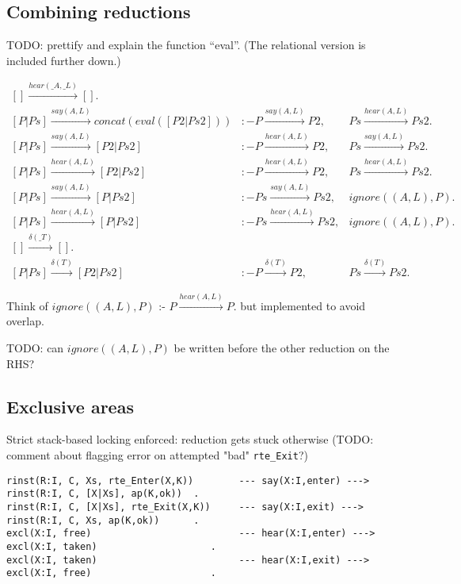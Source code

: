 \subsection{Combining reductions}

TODO: prettify and explain the function ``eval''. (The relational version is included further down.)

\newcommand{\reduce}[3]{\ensuremath{#1 \xrightarrow{#2} #3}}
\newcommand{\ignore}[1]{\ensuremath{\mathit{ignore}#1}}
\[
\begin{array}{lll}
  \reduce{[]}{hear(\_A,\_L)}{[]}. & &
\\\reduce{[ P | Ps ]}{say(A,L)} {concat(eval([P2 | Ps2]))}  &:- \reduce{P}{say(A,L)}{P2}  ,&  \reduce{Ps}{hear(A,L)}{Ps2}.
\\\reduce{[ P | Ps ]}{say(A,L)} {[ P2 | Ps2 ]}  &:- \reduce{P} {hear(A,L)}{P2}   ,&  \reduce{Ps}{say(A,L)} {Ps2} .
\\\reduce{[ P | Ps ]}{hear(A,L)}{[ P2 | Ps2 ]}  &:- \reduce{P} {hear(A,L)}{P2}   ,&  \reduce{Ps}{hear(A,L)}{Ps2} .
\\\reduce{[ P | Ps ]}{say(A,L)} {[ P  | Ps2 ]}  &:- \reduce{Ps}{say(A,L)} {Ps2}  ,&  \ignore{((A,L),P)}    .
\\\reduce{[ P | Ps ]}{hear(A,L)}{[ P  | Ps2 ]}  &:- \reduce{Ps}{hear(A,L)}{Ps2}  ,&  \ignore{((A,L),P)}    .
\\\reduce{[]}{\delta(\_T)}{[]}. & &
\\\reduce{[ P | Ps ]}{\delta(T)}{[ P2 | Ps2 ]}  &:- \reduce{P}{\delta(T)}{P2}    ,&  \reduce{Ps}{\delta(T)}{Ps2}  .
\end{array}
\]

Think of \ignore{((A,L),P)} :- \reduce{P}{hear(A,L)}{P}. but implemented to avoid overlap.

TODO: can \ignore{((A,L),P)} be written before the other reduction on the RHS?



\subsection{Exclusive areas}

Strict stack-based locking enforced: reduction gets stuck otherwise
(TODO: comment about flagging error on attempted "bad" \verb+rte_Exit+?)
\begin{verbatim}
rinst(R:I, C, Xs, rte_Enter(X,K))        --- say(X:I,enter) --->     rinst(R:I, C, [X|Xs], ap(K,ok))  .
rinst(R:I, C, [X|Xs], rte_Exit(X,K))     --- say(X:I,exit) --->      rinst(R:I, C, Xs, ap(K,ok))      .
excl(X:I, free)                          --- hear(X:I,enter) --->    excl(X:I, taken)                    .
excl(X:I, taken)                         --- hear(X:I,exit) --->     excl(X:I, free)                     .
\end{verbatim}

